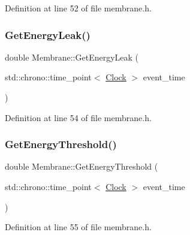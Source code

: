 Definition at line 52 of file membrane.\+h.

\mbox{\label{class_membrane_ac6c8d1f7348b24e448e8163260500b89}} 
\subsubsection{\texorpdfstring{Get\+Energy\+Leak()}{GetEnergyLeak()}}
{\footnotesize\ttfamily double Membrane\+::\+Get\+Energy\+Leak (\begin{DoxyParamCaption}\item[{std\+::chrono\+::time\+\_\+point$<$ \mbox{\hyperlink{universe_8h_a0ef8d951d1ca5ab3cfaf7ab4c7a6fd80}{Clock}} $>$}]{event\+\_\+time }\end{DoxyParamCaption})\hspace{0.3cm}{\ttfamily [inline]}}



Definition at line 54 of file membrane.\+h.

\mbox{\label{class_membrane_a7ce7398888bdad73ac848a2362261acf}} 
\subsubsection{\texorpdfstring{Get\+Energy\+Threshold()}{GetEnergyThreshold()}}
{\footnotesize\ttfamily double Membrane\+::\+Get\+Energy\+Threshold (\begin{DoxyParamCaption}\item[{std\+::chrono\+::time\+\_\+point$<$ \mbox{\hyperlink{universe_8h_a0ef8d951d1ca5ab3cfaf7ab4c7a6fd80}{Clock}} $>$}]{event\+\_\+time }\end{DoxyParamCaption})\hspace{0.3cm}{\ttfamily [inline]}}



Definition at line 55 of file membrane.\+h.

\mbox{\label{class_membrane_a1e2bdb800f0f38254214ea7cbdc06941}} 
